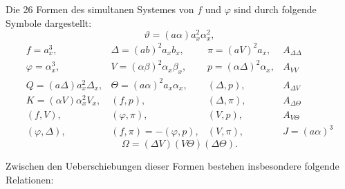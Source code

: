 Die 26 Formen des simultanen Systemes von $f$ und $\varphi$ sind durch
folgende Symbole dargestellt:
\[
\vartheta=(a\alpha)a_x^2\alpha_x^2,
\]
\[
\begin{array}{llll}
f=a_x^3, & \Delta=(ab)^2a_xb_x, & \pi=(aV)^2a_x, & A_{\Delta\Delta}\\
\varphi=\alpha_x^3, & V=(\alpha\beta)^2\alpha_x\beta_x, & p=(\alpha\Delta)^2\alpha_x, & A_{VV}\\
Q=(a\Delta)a_x^2\Delta_x, & \Theta=(a\alpha)^2a_x\alpha_x, & (\Delta,p), & A_{\Delta V}\\
K=(\alpha V)\alpha_x^2V_x, & (f,p), & (\Delta,\pi), & A_{\Delta\Theta}\\
(f,V), & (\varphi,\pi), & (V,p), & A_{V\Theta}\\
(\varphi,\Delta), & (f,\pi)=-(\varphi,p), & (V,\pi), & J=(a\alpha)^3
\end{array}
\]
\[
\Omega=(\Delta V)(V\Theta)(\Delta\Theta).
\]

Zwischen den Ueberschiebungen dieser Formen bestehen insbesondere
folgende Relationen:



